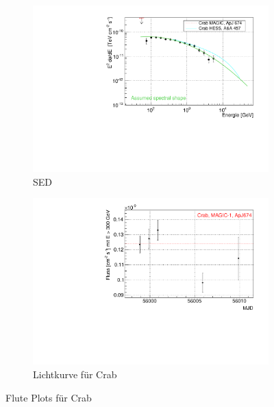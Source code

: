 \begin{figure}
\begin{subfigure}{0.45\linewidth}
  \end{subfigure}
  \hfill
  \begin{subfigure}{0.45\linewidth}
  \includegraphics[width=\textwidth]{./Plots/04_MrkAnalyse/Datenset2/Crab_SED.pdf}
  \caption{SED}
  \label{Datenset2_SED_Crab}
  \end{subfigure}
  \hfill
  \begin{subfigure}{0.45\linewidth}
  \includegraphics[width=\textwidth]{./Plots/04_MrkAnalyse/Datenset2/Crab_LC.pdf}
  \caption{Lichtkurve für Crab}
  \label{Datenset2_LC_Crab}
  \end{subfigure}
  \hfill
\caption{Flute Plots für Crab}
\label{Datenset2_Flute_Plots_Crab}
\end{figure}

